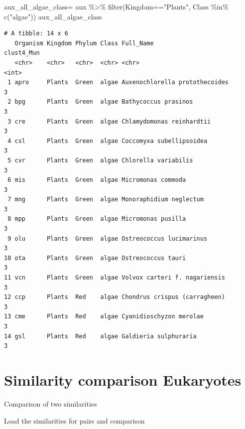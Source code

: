 \documentclass[
  letterpaper,
  DIV=11,
  numbers=noendperiod]{scrreprt}
\newenvironment{Shaded}{}{}
\newcommand{\FunctionTok}[1]{\textcolor[rgb]{0.38,0.69,0.94}{#1}}
\newcommand{\NormalTok}[1]{\textcolor[rgb]{0.67,0.70,0.75}{#1}}
\newcommand{\OtherTok}[1]{\textcolor[rgb]{0.15,0.68,0.38}{#1}}
\newcommand{\SpecialCharTok}[1]{\textcolor[rgb]{0.34,0.71,0.76}{#1}}
\newcommand{\StringTok}[1]{\textcolor[rgb]{0.60,0.76,0.47}{#1}}
\begin{document}
\begin{Shaded}
\begin{Highlighting}[]
\NormalTok{aux\_all\_algae\_class}\OtherTok{=}\NormalTok{ aux }\SpecialCharTok{\%\textgreater{}\%} 
  \FunctionTok{filter}\NormalTok{(Kingdom}\SpecialCharTok{==}\StringTok{"Plants"}\NormalTok{,}
\NormalTok{         Class }\SpecialCharTok{\%in\%} \FunctionTok{c}\NormalTok{(}\StringTok{"algae"}\NormalTok{))}
\NormalTok{aux\_all\_algae\_class}
\end{Highlighting}
\end{Shaded}

\begin{verbatim}
# A tibble: 14 x 6
   Organism Kingdom Phylum Class Full_Name                      clust4_Mun
   <chr>    <chr>   <chr>  <chr> <chr>                               <int>
 1 apro     Plants  Green  algae Auxenochlorella protothecoides          3
 2 bpg      Plants  Green  algae Bathycoccus prasinos                    3
 3 cre      Plants  Green  algae Chlamydomonas reinhardtii               3
 4 csl      Plants  Green  algae Coccomyxa subellipsoidea                3
 5 cvr      Plants  Green  algae Chlorella variabilis                    3
 6 mis      Plants  Green  algae Micromonas commoda                      3
 7 mng      Plants  Green  algae Monoraphidium neglectum                 3
 8 mpp      Plants  Green  algae Micromonas pusilla                      3
 9 olu      Plants  Green  algae Ostreococcus lucimarinus                3
10 ota      Plants  Green  algae Ostreococcus tauri                      3
11 vcn      Plants  Green  algae Volvox carteri f. nagariensis           3
12 ccp      Plants  Red    algae Chondrus crispus (carragheen)           3
13 cme      Plants  Red    algae Cyanidioschyzon merolae                 3
14 gsl      Plants  Red    algae Galdieria sulphuraria                   3
\end{verbatim}

\hypertarget{similarity-comparison-eukaryotes}{%
\section{Similarity comparison
Eukaryotes}\label{similarity-comparison-eukaryotes}}

Comparison of two similarities

Load the similarities for pairs and comparison

\begin{Shaded}
\end{Shaded}
\end{document}
